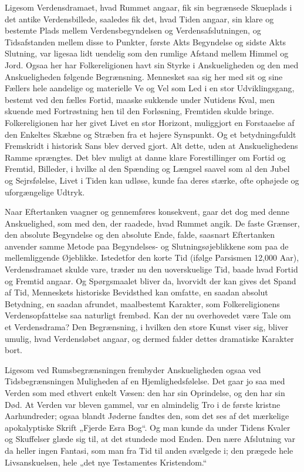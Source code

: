 \documentclass[12pt,a4paper]{article}
\newcommand{\opage}[1]{\marginnote{\footnotesize\textit{[#1]}}}
\begin{document}
Ligesom Verdensdramaet, hvad Rummet angaar, fik sin begrænsede Skueplads i
det antike Verdensbillede, saaledes fik det, hvad Tiden angaar, sin klare og
bestemte Plads mellem Verdensbegyndelsen og Verdensafslutningen, og
Tidsafstanden mellem disse to Punkter, første Akts Begyndelse og sidste Akts
Slutning, var ligesaa lidt uendelig som den rumlige Afstand mellem Himmel og
Jord. Ogsaa her har Folkereligionen havt sin Styrke i Anskueligheden og den
med Anskueligheden følgende Begrænsning. Mennesket saa sig her med sit og
sine Fællers hele aandelige og materielle Ve og Vel som Led i en stor
Udviklingsgang, bestemt ved den fælles Fortid, maaske sukkende under
Nutidens Kval, men skuende med Fortrøstning hen til den Forløsning,
Fremtiden skulde bringe. Folkereligionen har her givet Livet en stor
Horizont, muliggjort en Forstaaelse af den Enkeltes Skæbne og Stræben fra et
højere Synspunkt. Og et betydningsfuldt Fremskridt i historisk Sans blev
derved gjort. Alt dette, uden at Anskuelighedens Ramme sprængtes. Det blev
muligt at danne klare Forestillinger om Fortid og Fremtid, Billeder, i
hvilke al den Spænding og Længsel saavel som al den Jubel og Sejrsfølelse,
Livet i Tiden kan udløse, kunde faa deres stærke, ofte ophøjede og
uforgængelige Udtryk.

Naar Eftertanken vaagner og gennemføres konsekvent, \opage{15} gaar det dog med denne
Anskuelighed, som med den, der raadede, hvad Rummet angik. De faste
Grænser, den absolute Begyndelse og den absolute Ende, falde, saasnart
Eftertanken anvender samme Metode paa Begyndelses- og Slutningsøjeblikkene
som paa de mellemliggende Øjeblikke. Istedetfor den korte Tid (ifølge
Parsismen 12,000 Aar), Verdensdramaet skulde vare, træder nu den
uoverskuelige Tid, baade hvad Fortid og Fremtid angaar. Og Spørgsmaalet
bliver da, hvorvidt der kan gives det Spand af Tid, Menneskets historiske
Bevidsthed kan omfatte, en saadan absolut Betydning, en saadan afrundet,
maalbestemt Karakter, som Folkereligionens Verdensopfattelse saa naturligt
frembød. Kan der nu overhovedet være Tale om et Verdensdrama? Den
Begrænsning, i hvilken den store Kunst viser sig, bliver umulig, hvad
Verdensløbet angaar, og dermed falder dettes dramatiske Karakter bort.

Ligesom ved Rumsbegrænsningen frembyder Anskueligheden ogsaa ved
Tidsbegrænsningen Muligheden af en Hjemlighedsfølelse. Det gaar jo saa med
Verden som med ethvert enkelt Væsen: den har sin Oprindelse, og den har sin
Død. At Verden var bleven gammel, var en almindelig Tro i de første kristne
Aarhundreder; ogsaa blandt Jøderne fandtes den, som det ses af det mærkelige
apokalyptiske Skrift „Fjerde Esra Bog“. Og man kunde da under Tidens Kvaler
og Skuffelser glæde sig til, at det stundede mod Enden. Den nære Afslutning
var da heller ingen Fantasi, som man fra Tid til anden svælgede i; den
prægede hele Livsanskuelsen, hele „det nye Testamentes Kristendom.“
\end{document}
